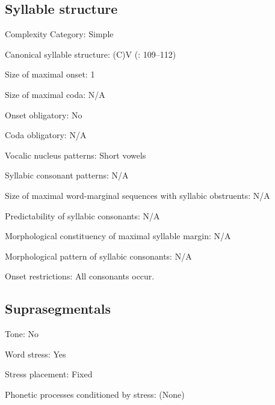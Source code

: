 {\subsection*{Syllable structure}
\begin{appendixdesc}

\item[Complexity Category:] Simple

\item[Canonical syllable structure:] (C)V (\citealt{Romero-Figeroa1997}: 109--112)

\item[Size of maximal onset:] 1

\item[Size of maximal coda:] N/A

\item[Onset obligatory:] No

\item[Coda obligatory:] N/A

\item[Vocalic nucleus patterns:] Short vowels

\item[Syllabic consonant patterns:] N/A

\item[Size of maximal word-marginal sequences with syllabic obstruents:] N/A

\item[Predictability of syllabic consonants:] N/A

\item[Morphological constituency of maximal syllable margin:] N/A

\item[Morphological pattern of syllabic consonants:] N/A

\item[Onset restrictions:] All consonants occur.
\end{appendixdesc}
\subsection*{Suprasegmentals}
\begin{appendixdesc}
\item[Tone:] No

\item[Word stress:] Yes

\item[Stress placement:] Fixed

\item[Phonetic processes conditioned by stress:] (None)


\end{appendixdesc}}
